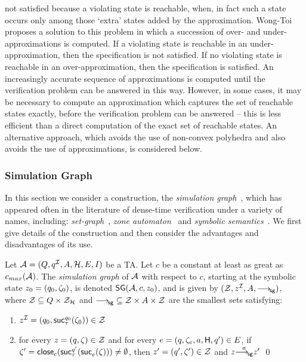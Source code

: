 {not satisfied because a violating state is reachable, when, in fact
such a state occurs only among those `extra' states added by the
approximation.  Wong-Toi~\cite{wt:95} proposes a solution to this
problem in which a succession of over- and under-approximations is
computed. If a violating state is reachable in an under-approximation,
then the specification is not satisfied. If no violating state is 
reachable in an over-approximation, then the specification is
satisfied. An increasingly accurate sequence of approximations is
computed until the verification problem can be answered in this
way. However, in some cases, it may be necessary to compute an
approximation which captures the set of reachable states exactly,
before the verification problem can be answered -- this is less
efficient than a direct computation of the exact set of reachable
states. An alternative approach, which avoids the use of non-convex polyhedra
and also avoids the use of approximations, is considered below.

\subsubsection{Simulation Graph} \label{sec:mscsimgraph}
In this section we consider a construction, the \emph{simulation
graph}~\cite{oli:94,dt:98}, which has appeared often in the literature
of dense-time verification under a variety of names, including:
\emph{set-graph}~\cite{acd:92,wt:95},
\emph{zone automaton}~\cite{ad:96,ak:95} and 
\emph{symbolic semantics}~\cite{lpy:95,pet:99}. We first give details of the
construction and then consider the advantages and disadvantages of its
use.

\begin{definition}\label{def:mscsimgraph}
Let $\AA = (\tglocs,\tgiloc,\Actions,\tgclks,\tgedges,\tginv)$ be a
TA. Let $c$ be a constant at least as great as $\cmax(\AA)$. The
\emph{simulation graph} of $\AA$ with respect to $c$, starting at the
symbolic state $z_0 = (q_0,{\zeta}_0)$, is denoted
$\SG(\AA,c,\z_0)$, and is given by $(\sgstates, \sginit, \Actions,
\goesSG{})$, where $\sgstates \subseteq \tglocs \cross \ClockZones$ and $\goesSG{} \subseteq \sgstates \cross \Actions \cross \sgstates$ are the smallest 
sets satisfying:
\begin{enumerate}
\item $\sginit = (\tgloc_0, \suc{\tau}{\tgloc_0}(\vexcond_0)) \in \sgstates$ 
\item for every $\z = (\tgloc,\vexcond) \in \sgstates$  and for every $e = (q, {\zeta}_e, a, {\sf H}, q') \in E$, if ${\zeta}' = {\mathop{{\sf close}_{c}}(\mathop{{\sf suc}_{\tau}^{q'}}(\mathop{{\sf suc}_{e}^{}}({\zeta})))} \neq \emptyset$,
then $\z' = (\tgloc',\vexcond') \in \sgstates$ and $z {{\mathrel{{\stackrel{a}{\longrightarrow_{\mathrm{\!{\sf sg}}}}}}}} z'$
\qed
\end{enumerate}
\end{definition}

}
